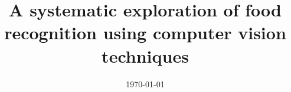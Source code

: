 \documentclass[a4paper, 12pt, oneside]{Thesis}  %
\begin{document}
\frontmatter     %
\title  {A systematic exploration of food recognition using computer vision techniques}
            
\addresses  {\groupname\\\deptname\\\univname}  %
\date       {\today}
\subject    {}
\keywords   {}

\maketitle


\fancyhead{}  %
\rhead{\thepage}  %
\lhead{}  %

\pagestyle{fancy}  %
\end{document}
